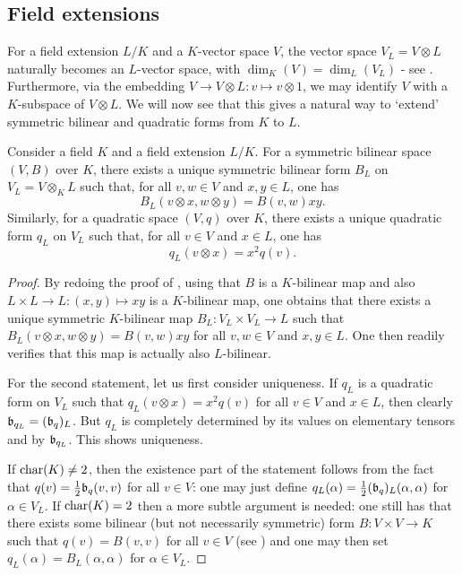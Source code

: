 \documentclass[12pt, leqno, british]{amsart}
\begin{document}
\subsection{Field extensions}
For a field extension $L/K$ and a $K$-vector space $V$, the vector space $V_L = V \otimes L$ naturally becomes an $L$-vector space, with $\dim_K(V) = \dim_L(V_L)$ - see .
Furthermore, via the embedding $V \to V \otimes L : v \mapsto v \otimes 1$, we may identify $V$ with a $K$-subspace of $V \otimes L$.
We will now see that this gives a natural way to `extend' symmetric bilinear and quadratic forms from $K$ to $L$.
\begin{prop}\label{P:scalar-extension}
Consider a field $K$ and a field extension $L/K$.
For a symmetric bilinear space $(V, B)$ over $K$, there exists a unique symmetric bilinear form $B_L$ on $V_L = V \otimes_K L$ such that, for all $v, w \in V$ and $x, y \in L$, one has
$$ B_L(v \otimes x, w \otimes y) = B(v, w)xy.$$
Similarly, for a quadratic space $(V, q)$ over $K$, there exists a unique quadratic form $q_L$ on $V_L$ such that, for all $v \in V$ and $x \in L$, one has
$$q_L(v \otimes x) = x^2q(v).$$
\end{prop}
\begin{proof}
By redoing the proof of , using that $B$ is a $K$-bilinear map and also $L \times L \to L : (x, y) \mapsto xy$ is a $K$-bilinear map, one obtains that there exists a unique symmetric $K$-bilinear map $B_L : V_L \times V_L \to L$ such that $B_L(v \otimes x, w \otimes y) = B(v, w)xy$ for all $v, w \in V$ and $x, y \in L$.
One then readily verifies that this map is actually also $L$-bilinear.

For the second statement, let us first consider uniqueness.
If $q_L$ is a quadratic form on $V_L$ such that $q_L(v \otimes x) = x^2 q(v)$ for all $v \in V$ and $x \in L$, then clearly $\mathfrak{b}_{q_L} = (\mathfrak{b}_q)_L$.
But $q_L$ is completely determined by its values on elementary tensors and by $\mathfrak{b}_{q_L}$.
This shows uniqueness.

If $\operatorname{char}(K) \neq 2$, then the existence part of the statement follows from the fact that $q(v) = \frac{1}{2}\mathfrak{b}_q(v, v)$ for all $v \in V$: one may just define $q_L(\alpha) = \frac{1}{2}(\mathfrak{b}_q)_L(\alpha, \alpha)$ for $\alpha \in V_L$.
If $\operatorname{char}(K) = 2$ then a more subtle argument is needed: one still has that there exists some bilinear (but not necessarily symmetric) form $B : V \times V \to K$ such that $q(v) = B(v, v)$ for all $v \in V$ (see \autocite[Section 7]{ElmanKarpenkoMerkurjev}) and one may then set $q_L(\alpha) = B_L(\alpha, \alpha)$ for $\alpha \in V_L$.
\end{proof}
\end{document}

